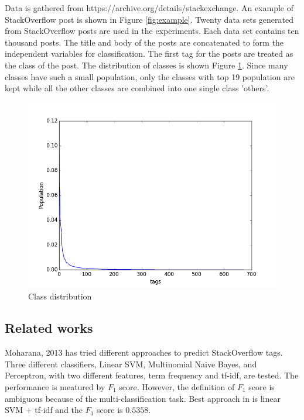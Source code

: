 \documentclass{sig-alternate-05-2015}
\begin{document}
Data is gathered from https://archive.org/details/stackexchange. An example of StackOverflow post is shown in Figure \ref{fig:example}. Twenty data sets generated from StackOverflow posts are used in the experiments. Each data set contains ten thousand posts. The title and body of the posts are concatenated to form the independent variables for classification. The first tag for the posts are treated as the class of the post. The distribution of classes is shown Figure \ref{fig:classes}. Since many classes have such a small population, only the classes with top 19 population are kept while all the other classes are combined into one single class 'others'.

\begin{figure}[ht]
  \includegraphics[width=\linewidth]{./fig/classes.png}
  \caption{Class distribution}
  \label{fig:classes}
\end{figure}

\subsection{Related works}

Moharana, 2013 \cite{moharanatag} has tried different approaches to predict StackOverflow tags. Three different classifiers, Linear SVM, Multinomial Naive Bayes, and Perceptron, with two different features, term frequency and tf-idf, are tested. The performance is meatured by $F_{1}$ score. However, the definition of $F_{1}$ score is ambiguous because of the multi-classification task. Best approach in \cite{moharanatag} is linear SVM + tf-idf and the $F_{1}$ score is $0.5358$.
\end{document}
